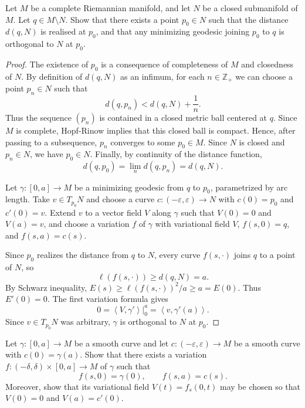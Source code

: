\begin{exercise}
\label{exercise-first-var-submfd-dist}
\begin{reference}
\cite[XIX]{doc}
\end{reference}
Let $M$ be a complete Riemannian manifold,
and let $N$ be a closed submanifold of $M$.
Let $q \in M\setminus N$. Show that
there exists a point $p_0 \in N$
such that the distance $d(q,N)$ is
realised at $p_0$, and that
any minimizing geodesic joining $p_0$ to $q$
is orthogonal to $N$ at $p_0$.
\end{exercise}

\begin{proof}
The existence of $p_0$ is a consequence of
completeness of $M$ and closedness of $N$.
By definition of $d(q,N)$ as an infimum, for
each $n \in \mathbb{Z}_+$ we can choose a
point $p_n \in N$ such that
$$
d(q,p_n)<d(q,N)+\frac{1}{n}.
$$
Thus the sequence $(p_n)$ is contained in a
closed metric ball centered at $q$. Since $M$
is complete, Hopf-Rinow implies that this
closed ball is compact. Hence, after passing
to a subsequence, $p_n$ converges to some
$p_0 \in M$. Since $N$ is closed and
$p_n \in N$, we have $p_0 \in N$. Finally,
by continuity of the distance function,
$$
d(q,p_0)=\lim_n d(q,p_n)=d(q,N).
$$

Let $\gamma:[0,a] \to M$ be a minimizing
geodesic from $q$ to $p_0$, parametrized by
arc length. Take $v\in T_{p_0}N$ and choose a
curve $c:(-\varepsilon,\varepsilon)\to N$
with $c(0)=p_0$ and $c'(0)=v$. Extend $v$ to
a vector field $V$ along $\gamma$ such that
$V(0)=0$ and $V(a)=v$, and choose a variation
$f$ of $\gamma$ with variational field $V$,
$f(s,0)=q$, and $f(s,a)=c(s)$.

Since $p_0$ realizes the distance from $q$ to
$N$, every curve $f(s,\cdot)$ joins $q$ to a
point of $N$, so
$$
\ell(f(s,\cdot))\geq d(q,N)=a.
$$
By Schwarz inequality,
$E(s)\geq \ell(f(s,\cdot))^2/a\geq a=E(0)$.
Thus $E'(0)=0$. The first variation formula
gives
$$
0=\left\langle{}V,\gamma'\right\rangle{}|_0^a
=\left\langle{}v,\gamma'(a)\right\rangle{}.
$$
Since $v\in T_{p_0}N$ was arbitrary, $\gamma$
is orthogonal to $N$ at $p_0$.
\end{proof}

\begin{exercise}
\label{exercise-endpoint-variation}
Let $\gamma:[0,a]\to M$ be a smooth curve and
let $c:(-\varepsilon,\varepsilon)\to M$ be a
smooth curve with $c(0)=\gamma(a)$. Show that
there exists a variation
$f:(-\delta,\delta)\times[0,a]\to M$ of
$\gamma$ such that
$$
f(s,0)=\gamma(0),\qquad f(s,a)=c(s).
$$
Moreover, show that its variational field
$V(t)=f_s(0,t)$ may be chosen so that
$V(0)=0$ and $V(a)=c'(0)$.
\end{exercise}

